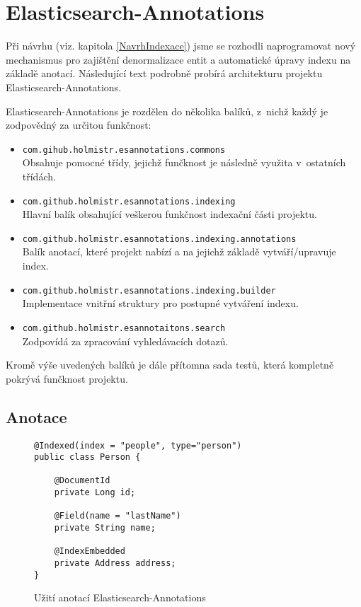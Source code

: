 \documentclass[11pt,oneside]{fithesis2}
\begin{document}
\chapter{Elasticsearch-Annotations}
\label{ElasticsearchAnnotationsChapter}
Při návrhu (viz. kapitola \ref{NavrhIndexace}) jsme se rozhodli naprogramovat nový mechanismus pro zajištění denormalizace entit a automatické úpravy indexu na základě anotací. Následující text podrobně probírá architekturu projektu Elasticsearch-Annotations. 

Elasticsearch-Annotations je rozdělen do několika balíků, z~nichž každý je zodpovědný za určitou funkčnost:
\begin{itemize}
	\item \texttt{com.gihub.holmistr.esannotations.commons} \\
		Obsahuje pomocné třídy, jejichž funčknost je následně využita v~ostatních třídách.

	\item \texttt{com.github.holmistr.esannotations.indexing} \\
		Hlavní balík obsahující veškerou funkčnost indexační části projektu.

	\item \texttt{com.github.holmistr.esannotations.indexing.annotations} \\
		Balík anotací, které projekt nabízí a na jejichž základě vytváří/upravuje index.

	\item \texttt{com.github.holmistr.esannotations.indexing.builder} \\
		Implementace vnitřní struktury pro postupné vytváření indexu.

	\item \texttt{com.github.holmistr.esannotaitons.search} \\
		Zodpovídá za zpracování vyhledávacích dotazů.		 
\end{itemize}

Kromě výše uvedených balíků je dále přítomna sada testů, která kompletně pokrývá funčknost projektu. 

\section{Anotace}
\label{EsAnnotationsAnotace}
\begin{figure}[!htbp]
\begin{lstlisting}[frame=single]
@Indexed(index = "people", type="person")
public class Person {

	@DocumentId
	private Long id;

	@Field(name = "lastName")
	private String name;

	@IndexEmbedded
	private Address address;
}
\end{lstlisting}
\caption{Užití anotací Elasticsearch-Annotations}
\label{AnnotationsExample}
\end{figure}
\end{document}
